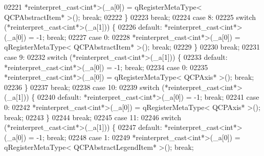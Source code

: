 \begin{DoxyCode}
02221                 *\textcolor{keyword}{reinterpret\_cast<}\textcolor{keywordtype}{int}*\textcolor{keyword}{>}(\_a[0]) = qRegisterMetaType< QCPAbstractItem* >(); \textcolor{keywordflow}{break};
02222             \}
02223             \textcolor{keywordflow}{break};
02224         \textcolor{keywordflow}{case} 8:
02225             \textcolor{keywordflow}{switch} (*reinterpret\_cast<int*>(\_a[1])) \{
02226             \textcolor{keywordflow}{default}: *\textcolor{keyword}{reinterpret\_cast<}\textcolor{keywordtype}{int}*\textcolor{keyword}{>}(\_a[0]) = -1; \textcolor{keywordflow}{break};
02227             \textcolor{keywordflow}{case} 0:
02228                 *\textcolor{keyword}{reinterpret\_cast<}\textcolor{keywordtype}{int}*\textcolor{keyword}{>}(\_a[0]) = qRegisterMetaType< QCPAbstractItem* >(); \textcolor{keywordflow}{break};
02229             \}
02230             \textcolor{keywordflow}{break};
02231         \textcolor{keywordflow}{case} 9:
02232             \textcolor{keywordflow}{switch} (*reinterpret\_cast<int*>(\_a[1])) \{
02233             \textcolor{keywordflow}{default}: *\textcolor{keyword}{reinterpret\_cast<}\textcolor{keywordtype}{int}*\textcolor{keyword}{>}(\_a[0]) = -1; \textcolor{keywordflow}{break};
02234             \textcolor{keywordflow}{case} 0:
02235                 *\textcolor{keyword}{reinterpret\_cast<}\textcolor{keywordtype}{int}*\textcolor{keyword}{>}(\_a[0]) = qRegisterMetaType< QCPAxis* >(); \textcolor{keywordflow}{break};
02236             \}
02237             \textcolor{keywordflow}{break};
02238         \textcolor{keywordflow}{case} 10:
02239             \textcolor{keywordflow}{switch} (*reinterpret\_cast<int*>(\_a[1])) \{
02240             \textcolor{keywordflow}{default}: *\textcolor{keyword}{reinterpret\_cast<}\textcolor{keywordtype}{int}*\textcolor{keyword}{>}(\_a[0]) = -1; \textcolor{keywordflow}{break};
02241             \textcolor{keywordflow}{case} 0:
02242                 *\textcolor{keyword}{reinterpret\_cast<}\textcolor{keywordtype}{int}*\textcolor{keyword}{>}(\_a[0]) = qRegisterMetaType< QCPAxis* >(); \textcolor{keywordflow}{break};
02243             \}
02244             \textcolor{keywordflow}{break};
02245         \textcolor{keywordflow}{case} 11:
02246             \textcolor{keywordflow}{switch} (*reinterpret\_cast<int*>(\_a[1])) \{
02247             \textcolor{keywordflow}{default}: *\textcolor{keyword}{reinterpret\_cast<}\textcolor{keywordtype}{int}*\textcolor{keyword}{>}(\_a[0]) = -1; \textcolor{keywordflow}{break};
02248             \textcolor{keywordflow}{case} 1:
02249                 *\textcolor{keyword}{reinterpret\_cast<}\textcolor{keywordtype}{int}*\textcolor{keyword}{>}(\_a[0]) = qRegisterMetaType< QCPAbstractLegendItem* >(); \textcolor{keywordflow}{break};

\end{DoxyCode}
